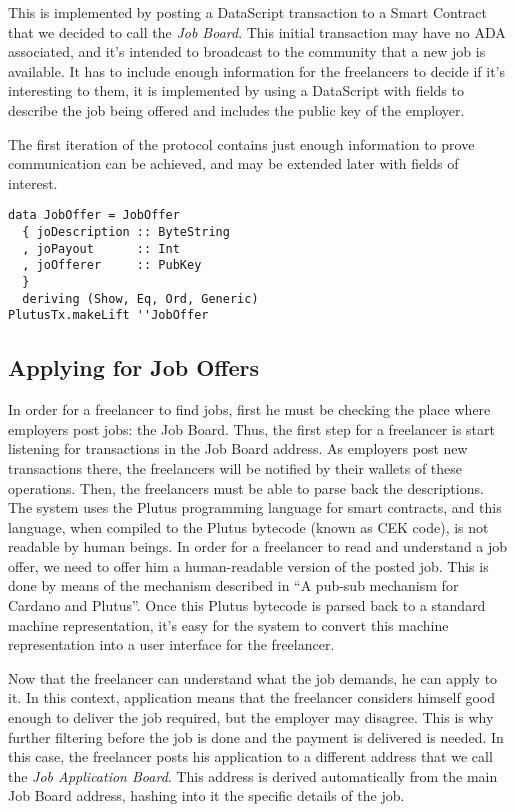 \documentclass{article}
\begin{document}
This is implemented by posting a DataScript transaction to a Smart Contract that we decided to call the \emph{Job Board}. This initial transaction may have no ADA associated, and it's intended to broadcast to the community that a new job is available. It has to include enough information for the freelancers to decide if it's interesting to them, it is implemented by using a DataScript with fields to describe the job being offered and includes the public key of the employer.

The first iteration of the protocol contains just enough information to prove communication can be achieved, and may be extended later with fields of interest.

\begin{samepage}
\begin{verbatim}
data JobOffer = JobOffer
  { joDescription :: ByteString
  , joPayout      :: Int
  , joOfferer     :: PubKey
  }
  deriving (Show, Eq, Ord, Generic)
PlutusTx.makeLift ''JobOffer
\end{verbatim}
\end{samepage}

\subsection{Applying for Job Offers}


In order for a freelancer to find jobs, first he must be checking the place where employers post jobs: the Job Board. Thus, the first step for a freelancer is start listening for transactions in the Job Board address. As employers post new transactions there, the freelancers will be notified by their wallets of these operations. Then, the freelancers must be able to parse back the descriptions. The system uses the Plutus programming language for smart contracts, and this language, when compiled to the Plutus bytecode (known as CEK code), is not readable by human beings. In order for a freelancer to read and understand a job offer, we need to offer him a human-readable version of the posted job. This is done by means of the mechanism described in ``A pub-sub mechanism for Cardano and Plutus''\cite{pub-sub-paper}. Once this Plutus bytecode is parsed back to a standard machine representation, it's easy for the system to convert this machine representation into a user interface for the freelancer.

Now that the freelancer can understand what the job demands, he can apply to it. In this context, application means that the freelancer considers himself good enough to deliver the job required, but the employer may disagree. This is why further filtering before the job is done and the payment is delivered is needed. In this case, the freelancer posts his application to a different address that we call the \emph{Job Application Board}. This address is derived automatically from the main Job Board address, hashing into it the specific details of the job.
\end{document}
